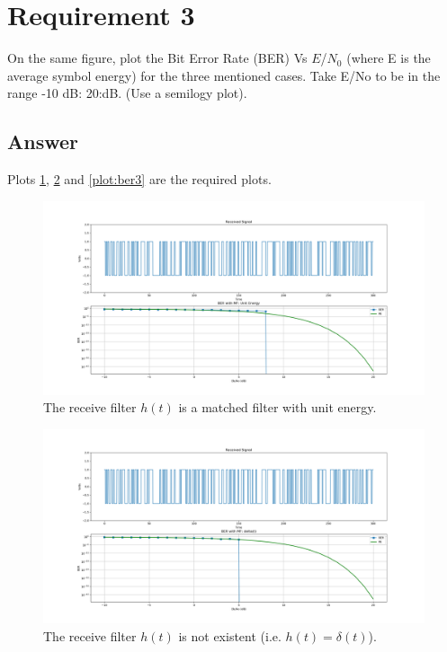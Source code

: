 \documentclass[
	12pt, %
	oneside
]{fphw}
\begin{document}
\section*{Requirement 3}
\begin{problem}
	On the same figure, plot the Bit Error Rate (BER) Vs $E$/$N_0$ (where E is the average symbol
energy) for the three mentioned cases. Take E/No to be in the range -10 dB: 20:dB. (Use a
semilogy plot).
\end{problem}

\subsection*{Answer}
Plots \ref{plot:ber1}, \ref{plot:ber2} and \ref{plot:ber3} are the required plots.

\begin{figure}[hp]
	\centering
	\includegraphics[width=17cm]{../graphs/1}
	\caption{The receive filter $h(t)$ is a matched filter with unit energy.}
	\label{plot:ber1}
\end{figure}

\begin{figure}[hp]
	\centering
	\includegraphics[width=17cm]{../graphs/2}
	\caption{The receive filter $h(t)$ is not existent (i.e. $h(t) = \delta(t)$).}
	\label{plot:ber2}
\end{figure}
\end{document}
